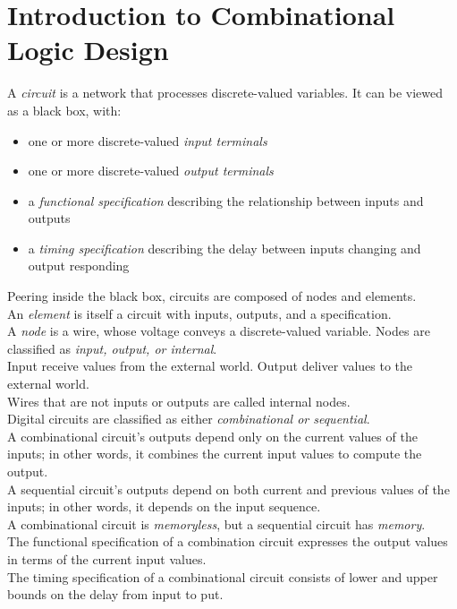\documentclass[12pt]{article}
\theoremstyle{definition}
\begin{document}
  \newpage
  \section{Introduction to Combinational Logic Design}
  A \emph{circuit} is a network that processes discrete-valued variables.
  It can be viewed as a black box, with:
  \begin{itemize}
    \item one or more discrete-valued \emph{input terminals}
    \item one or more discrete-valued \emph{output terminals}
    \item a \emph{functional specification} describing the relationship between inputs and outputs
    \item a \emph{timing specification} describing the delay between inputs changing and output responding
  \end{itemize}
  Peering inside the black box, circuits are composed of nodes and elements. \\
  An \emph{element} is itself a circuit with inputs, outputs, and a specification. \\
  A \emph{node} is a wire, whose voltage conveys a discrete-valued variable.
  Nodes are classified as \emph{input, output, \emph{or} internal}. \\
  Input receive values from the external world. Output deliver values to the external world. \\
  Wires that are not inputs or outputs are called internal nodes. \\

  Digital circuits are classified as either \emph{combinational \emph{or} sequential}. \\
  A combinational circuit's outputs depend only on the current values of the inputs; in other words, it combines the current input values to compute the output. \\
  A sequential circuit's outputs depend on both current and previous values of the inputs; in other words, it depends on the input sequence. \\
  A combinational circuit is \emph{memoryless}, but a sequential circuit has \emph{memory}. \\

  The functional specification of a combination circuit expresses the output values in terms of the current input values. \\
  The timing specification of a combinational circuit consists of lower and upper bounds on the delay from input to put. \\
\end{document}
